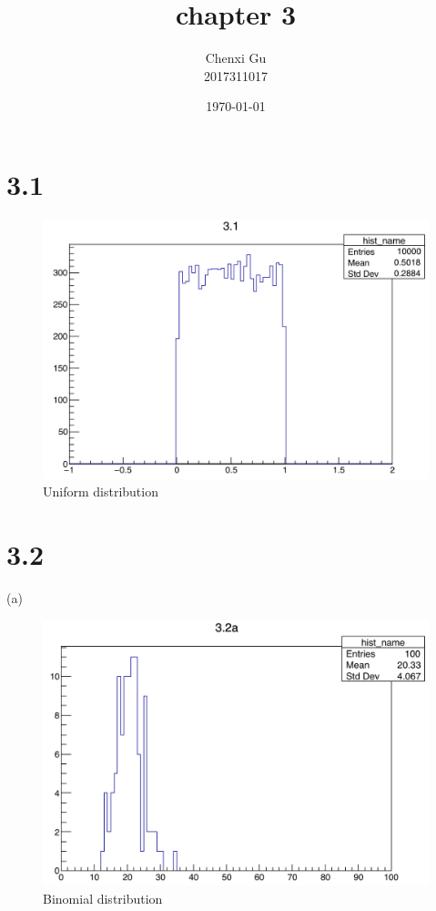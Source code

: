 \documentclass{article}
\begin{document}
\begin{CJK*}{GBK}{song}

\pagestyle{fancy}  
\fancyhead{} %
\renewcommand{\headrulewidth}{0.4pt}  
\renewcommand{\footrulewidth}{0.4pt} 



\title {chapter 3}
\author{Chenxi Gu\\2017311017}

\date{\today}

\maketitle

\section{3.1}
\begin{figure}[H]
\centerline{\includegraphics[scale=0.4]{3.1.png}}
\caption{Uniform distribution}
\label{fig:label}
\end{figure}

\section{3.2}
(a)
\begin{figure}[H]
\centerline{\includegraphics[scale=0.4]{3.2a.png}}
\caption{Binomial distribution}
\label{fig:label}
\end{figure}


\end{CJK*}
\end{document}
